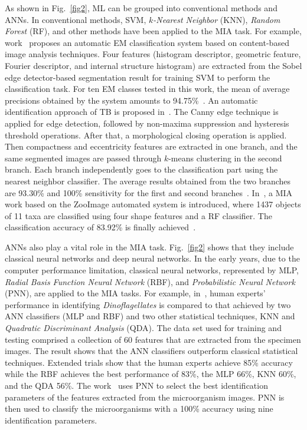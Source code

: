 As shown in Fig.~\ref{fig2}, ML can be grouped into conventional methods and ANNs. In conventional methods, SVM, \emph{$k$-Nearest Neighbor} (KNN), \emph{Random Forest} (RF), and other methods have been applied to the MIA task. For example, work~\cite{Li-2015-ACIA} proposes an automatic EM classification system based on content-based image analysis techniques. Four features (histogram descriptor, geometric feature, Fourier descriptor, and internal structure histogram) are extracted from the Sobel edge detector-based segmentation result for training SVM to perform the classification task. For ten EM classes tested in this work, the mean of average precisions obtained by the system amounts to 94.75\%~\cite{Kulwa-2019-ASSM}. An automatic identification approach of TB is proposed in~\cite{Forero-2003-AITT}. The Canny edge technique is applied for edge detection, followed by non-maxima suppression and hysteresis threshold operations. After that, a morphological closing operation is applied. Then compactness and eccentricity features are extracted in one branch, and the same segmented images are passed through $k$-means clustering in the second branch. Each branch independently goes to the classification part using the nearest neighbor classifier. The average results obtained from the two branches are 93.30\% and 100\% sensitivity for the first and second branches~\cite{Kulwa-2019-ASSM}. In~\cite{Di-2011-UZAS}, a MIA work based on the ZooImage automated system is introduced, where 1437 objects of 11 taxa are classified using four shape features and a RF classifier. The classification accuracy of 83.92\% is finally achieved~\cite{Li-2016-CMIA}.


ANNs also play a vital role in the MIA task. Fig.~\ref{fig2} shows that they include classical neural networks and deep neural networks. In the early years, due to the computer performance limitation, classical neural networks, represented by MLP, \emph{Radial Basis Function Neural Network} (RBF), and \emph{Probabilistic Neural Network} (PNN), are applied to the MIA tasks. For example, in~\cite{Culverhouse-1996-ACFD}, human experts' performance in identifying \emph{Dinoflagellates} is compared to that achieved by two ANN classifiers (MLP and RBF) and two other statistical techniques, KNN and \emph{Quadratic Discriminant Analysis} (QDA). The data set used for training and testing comprised a collection of 60 features that are extracted from the specimen images. The result shows that the ANN classifiers outperform classical statistical techniques. Extended trials show that the human experts achieve 85\% accuracy while the RBF achieves the best performance of 83\%, the MLP 66\%, KNN 60\%, and the QDA 56\%. The work~\cite{Kumar-2010-RDMU} uses PNN to select the best identification parameters of the features extracted from the microorganism images. PNN is then used to classify the microorganisms with a 100\% accuracy using nine identification parameters.



